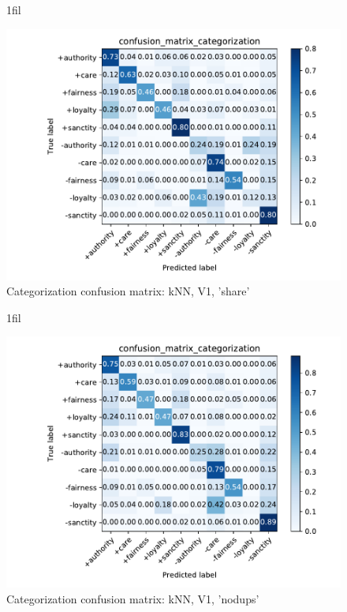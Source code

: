 \documentclass{article}
\makeatletter
\newcommand*{\centerfloat}{%
  \parindent \z@
  \leftskip \z@ \@plus 1fil \@minus \textwidth
  \rightskip\leftskip
  \parfillskip \z@skip}
\makeatother
\begin{document}
\begin{figure}[H]
    \centerfloat
    \caption{Categorization confusion matrix: kNN, V1, 'share'}
    \includegraphics[width=1.3\linewidth]{../../plots-2/confusion-matrix-knn-v1-share/confusion_matrix_categorization.pdf}
\end{figure}

\begin{figure}[H]
    \centerfloat
    \caption{Categorization confusion matrix: kNN, V1, 'nodups'}
    \includegraphics[width=1.3\linewidth]{../../plots-2/confusion-matrix-knn-v1-nodups/confusion_matrix_categorization.pdf}
\end{figure}
\end{document}
